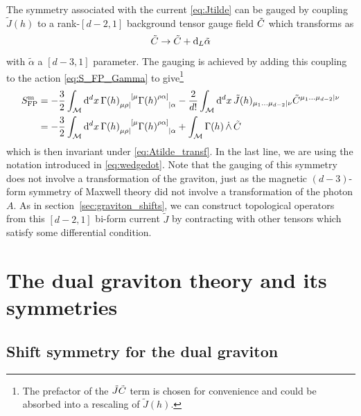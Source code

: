 The symmetry associated with the current \eqref{eq:Jtilde} can be gauged by coupling $\tilde{J}(h)$ to a rank-$[d-2,1]$ background tensor gauge field $\tilde{C}$ which transforms as
\begin{equation}\label{eq:Atilde_transf}
    \tilde{C} \to \tilde{C} + \dd_L \tilde{\alpha}
\end{equation}
with $\tilde{\alpha}$ a $[d-3,1]$ parameter.
The gauging is achieved by adding this coupling to the  action \eqref{eq:S_FP_Gamma} to give\footnote{The prefactor of the $\tilde{J}\tilde{C}$ term is chosen for convenience and could be absorbed into a rescaling of $\tilde{J}(h)$.}
\begin{align}
\begin{split}\label{eq:S_magnetic_gauged}
    S_{\text{FP}}^{\text{m}} &= -\frac{3}{2} \int_{\mathcal{M}} \dd[d]{x} \Gamma(h)\indices{_{\mu\rho|}^{[\mu}} \Gamma(h)\indices{^{\rho\alpha]}_{|\alpha}} -\frac{2}{d!} \int_{\mathcal{M}} \dd[d]{x} \tilde{J}(h)_{\mu_1\dots\mu_{d-2}|\nu} \gaugefieldtilde^{\mu_1\dots\mu_{d-2}|\nu} \\
    &= -\frac{3}{2} \int_{\mathcal{M}} \dd[d]{x} \Gamma(h)\indices{_{\mu\rho|}^{[\mu}} \Gamma(h)\indices{^{\rho\alpha]}_{|\alpha}} + \int_{\mathcal{M}} \Gamma(h) \,\wedgedot\, \gaugefieldtilde
\end{split}
\end{align}
which is then invariant under \eqref{eq:Atilde_transf}.
In the last line, we are using the notation introduced in \eqref{eq:wedgedot}.
Note that the gauging of this symmetry does not involve a transformation of the graviton, just as the magnetic $(d-3)$-form symmetry of Maxwell theory did not involve a transformation of the photon $A$.
As in section~\ref{sec:graviton_shifts}, we can construct topological operators from this $[d-2,1]$ bi-form current $\tilde{J}$ by contracting with other tensors which satisfy some differential condition.

\section{The dual graviton theory and its symmetries}
\label{sec:shifts_for_dual}

\subsection{Shift symmetry for the dual graviton}

